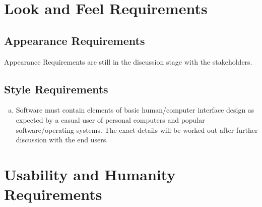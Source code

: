 \documentclass[paper=letter, fontsize=10pt]{scrartcl}
\numberwithin{equation}{section}		%
\numberwithin{figure}{section}			%
\numberwithin{table}{section}				%
\begin{document}
\section{Look and Feel Requirements}
\subsection{Appearance Requirements}
Appearance Requirements are still in the discussion stage with the stakeholders.
\subsection{Style Requirements}
\begin{enumerate}[(a)]
	\item Software must contain elements of basic human/computer interface design as expected by a casual user of personal computers and popular software/operating systems. The exact details will be worked out after further discussion with the end users.
\end{enumerate}

\section{Usability and Humanity Requirements}
\end{document}
